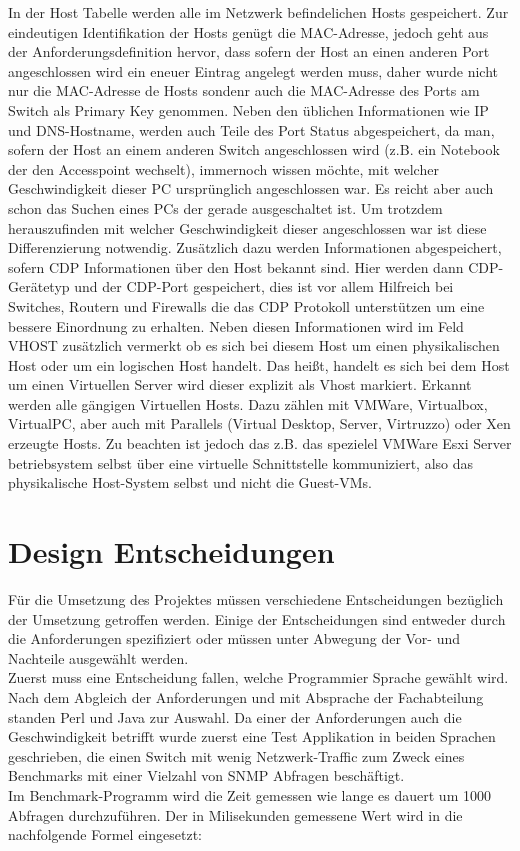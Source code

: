 In der Host Tabelle werden alle im Netzwerk befindelichen Hosts gespeichert. Zur eindeutigen Identifikation der Hosts genügt die MAC-Adresse, jedoch geht aus der Anforderungsdefinition hervor, dass sofern der Host an einen anderen Port angeschlossen wird ein eneuer Eintrag angelegt werden muss, daher wurde nicht nur die MAC-Adresse de Hosts sondenr auch die MAC-Adresse des Ports am Switch als Primary Key genommen. Neben den üblichen Informationen wie IP und DNS-Hostname, werden auch Teile des Port Status abgespeichert, da man, sofern der Host an einem anderen Switch angeschlossen wird (z.B. ein Notebook der den Accesspoint wechselt), immernoch wissen möchte, mit welcher Geschwindigkeit dieser PC ursprünglich angeschlossen war. Es reicht aber auch schon das Suchen eines PCs der gerade ausgeschaltet ist. Um trotzdem herauszufinden mit welcher Geschwindigkeit dieser angeschlossen war ist diese Differenzierung notwendig. Zusätzlich dazu werden Informationen abgespeichert, sofern CDP Informationen über den Host bekannt sind. Hier werden dann CDP-Gerätetyp und der CDP-Port gespeichert, dies ist vor allem Hilfreich bei Switches, Routern und Firewalls die das CDP Protokoll unterstützen um eine bessere Einordnung zu erhalten. Neben diesen Informationen wird im Feld VHOST zusätzlich vermerkt ob es sich bei diesem Host um einen physikalischen Host oder um ein logischen Host handelt. Das heißt, handelt es sich bei dem Host um einen Virtuellen Server wird dieser explizit als Vhost markiert. Erkannt werden alle gängigen Virtuellen Hosts. Dazu zählen mit VMWare, Virtualbox, VirtualPC, aber auch mit Parallels (Virtual Desktop, Server, Virtruzzo) oder Xen erzeugte Hosts. Zu beachten ist jedoch das z.B. das spezielel VMWare Esxi Server betriebsystem selbst über eine virtuelle Schnittstelle kommuniziert, also das physikalische Host-System selbst und nicht die Guest-VMs.


\section{Design Entscheidungen}
\label{sec:designent}

Für die Umsetzung des Projektes müssen verschiedene Entscheidungen bezüglich der Umsetzung getroffen werden. Einige der Entscheidungen sind entweder durch die Anforderungen spezifiziert oder müssen unter Abwegung der Vor- und Nachteile ausgewählt werden.\\
Zuerst muss eine Entscheidung fallen, welche Programmier Sprache gewählt wird. Nach dem Abgleich der Anforderungen und mit Absprache der Fachabteilung standen Perl und Java zur Auswahl. Da einer der Anforderungen auch die Geschwindigkeit betrifft wurde zuerst eine Test Applikation in beiden Sprachen geschrieben, die einen Switch mit wenig Netzwerk-Traffic zum Zweck eines Benchmarks mit einer Vielzahl von SNMP Abfragen beschäftigt.\\
Im Benchmark-Programm wird die Zeit gemessen wie lange es dauert um 1000 Abfragen durchzuführen. Der in Milisekunden gemessene Wert wird in die nachfolgende Formel eingesetzt:\\

